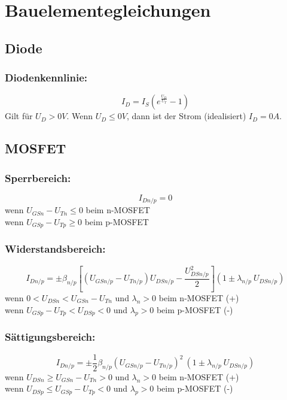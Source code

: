 \documentclass[a4paper,11pt]{article}
\begin{document}
\section*{Bauelementegleichungen}
\subsection*{Diode}
\subsubsection*{Diodenkennlinie:}
\[\boxed{I_D=I_S\left(e^{\frac{U_D}{U_T}}-1\right)}\]
Gilt für $U_D > 0V$. Wenn $U_D \leq 0V$, dann ist der Strom (idealisiert) $I_D = 0A$.

\subsection*{MOSFET}
\subsubsection*{Sperrbereich:}
\[\boxed{I_{Dn/p} = 0}\] 
wenn $ U_{GSn}-U_{Tn} \leq 0$ beim n-MOSFET\\
wenn $ U_{GSp}-U_{Tp} \geq 0$ beim p-MOSFET

\subsubsection*{Widerstandsbereich:}
\[\boxed{I_{Dn/p} = \pm\beta_{n/p}\left[(U_{GSn/p}-U_{Tn/p}) U_{DSn/p}-\dfrac{U_{DSn/p}^2}{2}\right](1\pm\lambda_{n/p}\ U_{DSn/p})}\] 
wenn $0<U_{DSn}<U_{GSn}-U_{Tn}$ und $\lambda_n>0$ beim n-MOSFET (+)\\
wenn $U_{GSp}-U_{Tp}<U_{DSp}<0$ und $\lambda_p>0$ beim p-MOSFET (-)

\subsubsection*{Sättigungsbereich:}
\[\boxed{I_{Dn/p}=\pm\dfrac{1}{2}\beta_{n/p}\left(U_{GSn/p}-U_{Tn/p}\right)^2\ (1\pm\lambda_{n/p}\ U_{DSn/p})}\]
wenn $U_{DSn}\geq U_{GSn}-U_{Tn}>0$ und $\lambda_n>0$ beim n-MOSFET (+)\\
wenn $U_{DSp}\leq U_{GSp}-U_{Tp}<0$ und $\lambda_p>0$ beim p-MOSFET (-)
\end{document}

